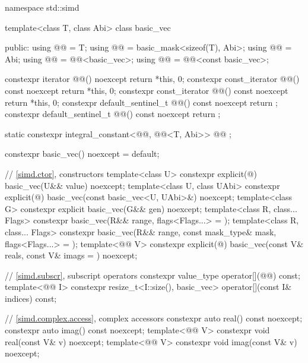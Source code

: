 %
\begin{codeblock}
namespace std::simd {
  template<class T, class Abi> class basic_vec {
  public:
    using @@ = T;
    using @@ = basic_mask<sizeof(T), Abi>;
    using @@ = Abi;
    using @@ = @@<basic_vec>;
    using @@ = @@<const basic_vec>;

    constexpr iterator @@() noexcept { return {*this, 0}; }
    constexpr const_iterator @@() const noexcept { return {*this, 0}; }
    constexpr const_iterator @@() const noexcept { return {*this, 0}; }
    constexpr default_sentinel_t @@() const noexcept { return {}; }
    constexpr default_sentinel_t @@() const noexcept { return {}; }

    static constexpr integral_constant<@@, @@<T, Abi>> @@ {};

    constexpr basic_vec() noexcept = default;

    // \ref{simd.ctor},  constructors
    template<class U>
      constexpr explicit(@\seebelow@) basic_vec(U&& value) noexcept;
    template<class U, class UAbi>
      constexpr explicit(@\seebelow@) basic_vec(const basic_vec<U, UAbi>&) noexcept;
    template<class G>
      constexpr explicit basic_vec(G&& gen) noexcept;
    template<class R, class... Flags>
      constexpr basic_vec(R&& range, flags<Flags...> = {});
    template<class R, class... Flags>
      constexpr basic_vec(R&& range, const mask_type& mask, flags<Flags...> = {});
    template<@@ V>
      constexpr explicit(@\seebelow@) basic_vec(const V& reals, const V& imags = {}) noexcept;

    // \ref{simd.subscr},  subscript operators
    constexpr value_type operator[](@@) const;
    template<@@ I>
      constexpr resize_t<I::size(), basic_vec> operator[](const I& indices) const;

    // \ref{simd.complex.access},  complex accessors
    constexpr auto real() const noexcept;
    constexpr auto imag() const noexcept;
    template<@@ V>
      constexpr void real(const V& v) noexcept;
    template<@@ V>
      constexpr void imag(const V& v) noexcept;

}}
\end{codeblock}
